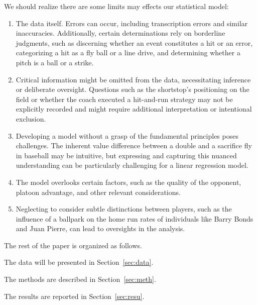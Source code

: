 \documentclass[12pt]{article}
\begin{document}
We should realize there are some limits may effects our statistical model:
\begin{enumerate}
\item The data itself. Errors can occur, including transcription errors and similar inaccuracies. Additionally, 
certain determinations rely on borderline judgments, such as discerning whether an event constitutes a hit or an
error, categorizing a hit as a fly ball or a line drive, and determining whether a pitch is a ball or a strike.

\item Critical information might be omitted from the data, necessitating inference or deliberate oversight. 
Questions such as the shortstop's positioning on the field or whether the coach executed a hit-and-run strategy may 
not be explicitly recorded and might require additional interpretation or intentional exclusion.

\item Developing a model without a grasp of the fundamental principles poses challenges. The inherent value
difference between a double and a sacrifice fly in baseball may be intuitive, but expressing and capturing this 
nuanced understanding can be particularly challenging for a linear regression model.

\item The model overlooks certain factors, such as the quality of the opponent, platoon advantage, and other 
relevant considerations.

\item Neglecting to consider subtle distinctions between players, such as the influence of a ballpark on the home 
run rates of individuals like Barry Bonds and Juan Pierre, can lead to oversights in the analysis.
\end{enumerate}




\cite*{web:Wyers:Part2}

The rest of the paper is organized as follows.

The data will be presented in Section~\ref{sec:data}.

The methods are described in Section~\ref{sec:meth}.

The results are reported in Section~\ref{sec:resu}.
\end{document}
